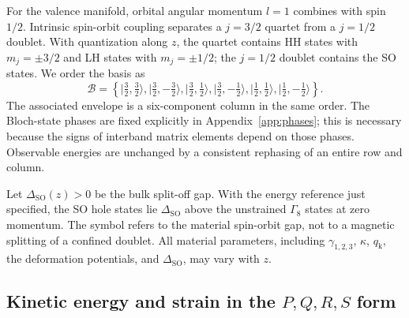 \documentclass[10pt,letterpaper]{article}
\newcommand{\ket}[1]{\lvert #1\rangle}
\newcommand{\qq}{q_{\mathrm k}}
\newcommand{\SO}{\mathrm{SO}}
\begin{document}
For the valence manifold, orbital angular momentum $l=1$ combines with spin $1/2$. Intrinsic spin-orbit coupling separates a $j=3/2$ quartet from a $j=1/2$ doublet. With quantization along $z$, the quartet contains HH states with $m_j=\pm3/2$ and LH states with $m_j=\pm1/2$; the $j=1/2$ doublet contains the SO states. We order the basis as
\begin{equation}
\mathcal B=\left\{
\ket{\tfrac32,\tfrac32},\ket{\tfrac32,-\tfrac32},
\ket{\tfrac32,\tfrac12},\ket{\tfrac32,-\tfrac12},
\ket{\tfrac12,\tfrac12},\ket{\tfrac12,-\tfrac12}
\right\}.
\label{eq:basis}
\end{equation}
The associated envelope is a six-component column in the same order. The Bloch-state phases are fixed explicitly in Appendix~\ref{app:phases}; this is necessary because the signs of interband matrix elements depend on those phases. Observable energies are unchanged by a consistent rephasing of an entire row and column.

Let $\Delta_{\SO}(z)>0$ be the bulk split-off gap. With the energy reference just specified, the SO hole states lie $\Delta_{\SO}$ above the unstrained $\Gamma_8$ states at zero momentum. The symbol refers to the material spin-orbit gap, not to a magnetic splitting of a confined doublet. All material parameters, including $\gamma_{1,2,3}$, $\kappa$, $\qq$, the deformation potentials, and $\Delta_{\SO}$, may vary with $z$.

\subsection{Kinetic energy and strain in the \texorpdfstring{$P,Q,R,S$}{P,Q,R,S} form}
\end{document}
